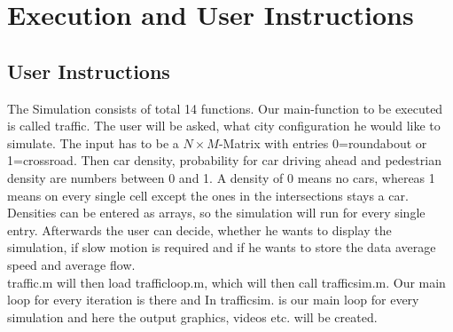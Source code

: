 \section{Execution and User Instructions}
\subsection{User Instructions}
The Simulation consists of total 14 functions. Our main-function to be executed is called traffic. 
The user will be asked, what city configuration he would like to simulate. The input has to be a $N \times M$-Matrix with entries 0=roundabout or 1=crossroad. 
Then car density, probability for car driving ahead and pedestrian density are numbers between 0 and 1. A density of 0 means no cars, whereas 1 means on every single cell except the ones in the intersections stays a car. 
Densities can be entered as arrays, so the simulation will run for every single entry. 
Afterwards the user can decide, whether he wants to display the simulation, if slow motion is required and if he wants to store the data average speed and average flow. \\
traffic.m will then load trafficloop.m, which will then call trafficsim.m. Our main loop for every iteration is there and In trafficsim. is our main loop for every simulation and here the output graphics, videos etc. will be created. 
